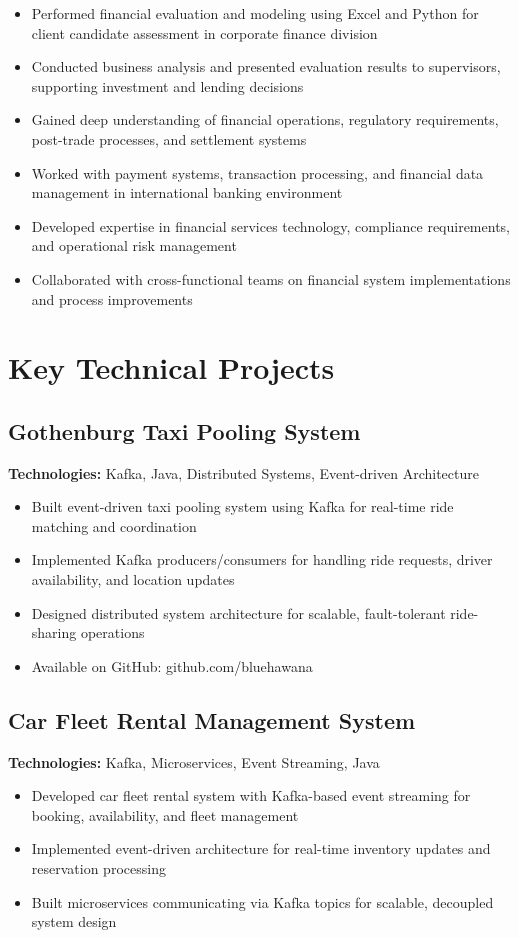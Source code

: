 \documentclass[11pt,a4paper]{article}
\begin{document}
\begin{itemize}[leftmargin=*, itemsep=2pt]
\item Performed financial evaluation and modeling using Excel and Python for client candidate assessment in corporate finance division
\item Conducted business analysis and presented evaluation results to supervisors, supporting investment and lending decisions
\item Gained deep understanding of financial operations, regulatory requirements, post-trade processes, and settlement systems
\item Worked with payment systems, transaction processing, and financial data management in international banking environment
\item Developed expertise in financial services technology, compliance requirements, and operational risk management
\item Collaborated with cross-functional teams on financial system implementations and process improvements
\end{itemize}

\section*{Key Technical Projects}

\subsection*{Gothenburg Taxi Pooling System}
\textbf{Technologies:} Kafka, Java, Distributed Systems, Event-driven Architecture
\begin{itemize}[leftmargin=*, itemsep=1pt]
\item Built event-driven taxi pooling system using Kafka for real-time ride matching and coordination
\item Implemented Kafka producers/consumers for handling ride requests, driver availability, and location updates
\item Designed distributed system architecture for scalable, fault-tolerant ride-sharing operations
\item Available on GitHub: github.com/bluehawana
\end{itemize}

\subsection*{Car Fleet Rental Management System}
\textbf{Technologies:} Kafka, Microservices, Event Streaming, Java
\begin{itemize}[leftmargin=*, itemsep=1pt]
\item Developed car fleet rental system with Kafka-based event streaming for booking, availability, and fleet management
\item Implemented event-driven architecture for real-time inventory updates and reservation processing
\item Built microservices communicating via Kafka topics for scalable, decoupled system design
\end{itemize}
\end{document}
